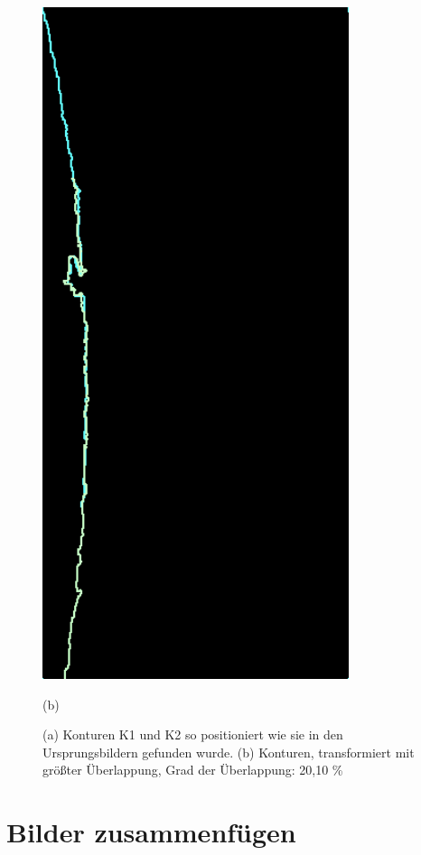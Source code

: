 \begin{figure}[H]
\begin{minipage}{0.49\textwidth}
        \includegraphics[width=0.8\textwidth]{images/matched_cons.png} %
        \caption*{(b)}
    \end{minipage}\hfill
    \caption{(a) Konturen K1 und K2 so positioniert wie sie in den
    Ursprungsbildern gefunden wurde.
    (b) Konturen, transformiert mit größter Überlappung, 
        Grad der Überlappung: 20,10 \%}
        \label{fig:k1_and_k2}
\end{figure}

\section{Bilder zusammenfügen}

